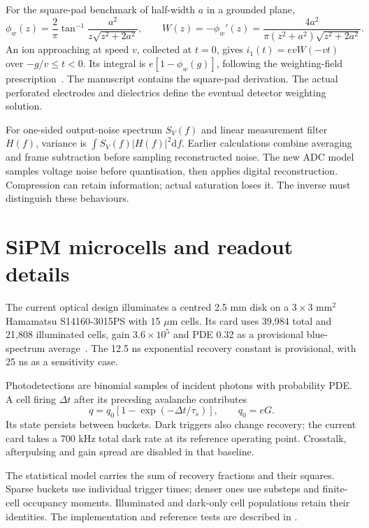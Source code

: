 \documentclass[11pt,a4paper]{article}
\newcommand{\dd}{\mathrm{d}}
\newcommand{\code}[1]{\path{#1}}
\begin{document}
For the square-pad benchmark of half-width $a$ in a grounded plane,
\begin{equation}
 \phi_w(z)=\frac2\pi\tan^{-1}\frac{a^2}{z\sqrt{z^2+2a^2}},\qquad
 W(z)=-\phi_w'(z)=\frac{4a^2}{\pi(z^2+a^2)\sqrt{z^2+2a^2}}.
\end{equation}
An ion approaching at speed $v$, collected at $t=0$, gives
$i_1(t)=evW(-vt)$ over $-g/v\leq t<0$. Its integral is
$e[1-\phi_w(g)]$, following the weighting-field prescription~\cite{riegler2016}.
The manuscript contains the square-pad derivation. The actual perforated
electrodes and dielectrics define the eventual detector weighting solution.

For one-sided output-noise spectrum $S_V(f)$ and linear measurement filter
$H(f)$, variance is $\int S_V(f)|H(f)|^2\dd f$. Earlier calculations combine
averaging and frame subtraction before sampling reconstructed noise. The new
ADC model samples voltage noise before quantisation, then applies digital
reconstruction. Compression can retain information; actual saturation loses
it. The inverse must distinguish these behaviours.

\section{SiPM microcells and readout details}
\label{app:sipm}
The current optical design illuminates a centred 2.5 mm disk on a
$3\times3$ mm$^2$ Hamamatsu S14160-3015PS with 15 $\mu$m cells. Its card uses
39,984 total and 21,808 illuminated cells, gain $3.6\times10^5$ and PDE 0.32
as a provisional blue-spectrum average~\cite{HamamatsuS14160SmallCells}.
The 12.5 ns exponential recovery constant is provisional, with 25 ns as a
sensitivity case.

Photodetections are binomial samples of incident photons with probability
PDE. A cell firing $\Delta t$ after its preceding avalanche contributes
\begin{equation}
 q=q_0[1-\exp(-\Delta t/\tau_s)],\qquad q_0=eG.
\end{equation}
Its state persists between buckets. Dark triggers also change recovery; the
current card takes a 700 kHz total dark rate at its reference operating point.
Crosstalk, afterpulsing and gain spread are disabled in that baseline.

The statistical model carries the sum of recovery fractions and their
squares. Sparse buckets use individual trigger times; denser ones use
substeps and finite-cell occupancy moments. Illuminated and dark-only cell
populations retain their identities. The implementation and reference tests
are described in \code{../../docs/sipm_statistical_implementation.md}.
\end{document}
